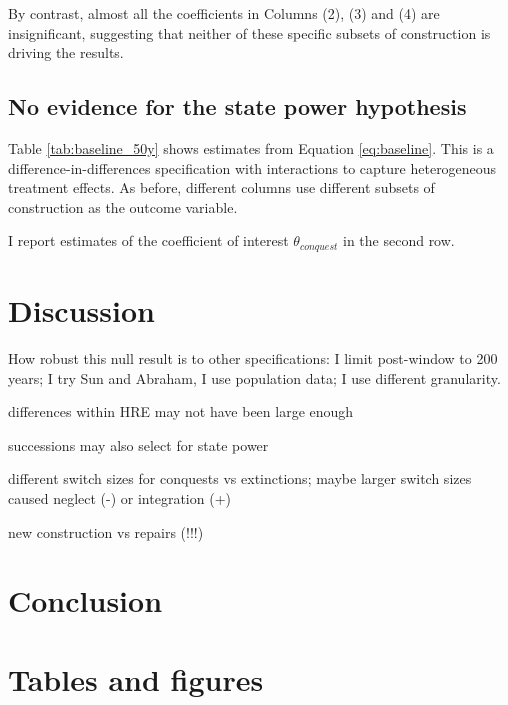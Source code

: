 \documentclass[11pt, a4paper]{article}
\begin{document}
By contrast, almost all the coefficients in Columns (2), (3) and (4) are insignificant, suggesting that neither of these specific subsets of construction is driving the results. 


\subsection{No evidence for the state power hypothesis}

Table \ref{tab:baseline_50y} shows estimates from Equation \eqref{eq:baseline}. This is a difference-in-differences specification with interactions to capture heterogeneous treatment effects. As before, different columns use different subsets of construction as the outcome variable.

I report estimates of the coefficient of interest $\theta_{conquest}$ in the second row. 




\section{Discussion}

How robust this null result is to other specifications: I limit post-window to 200 years; I try Sun and Abraham, I use population data; I use different granularity.

differences within HRE may not have been large enough

successions may also select for state power

different switch sizes for conquests vs extinctions; maybe larger switch sizes caused neglect (-) or integration (+)

new construction vs repairs (!!!)



\section{Conclusion}

\newpage
\onehalfspacing



\newpage
\section*{Tables and figures}
\end{document}
